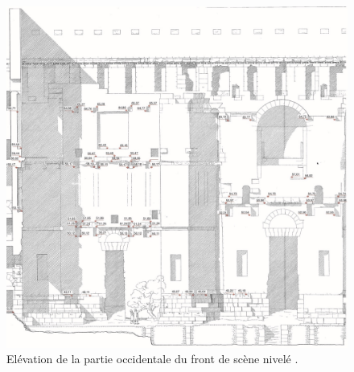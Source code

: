 \begin{figure}[!h]
	\includegraphics[width=\linewidth]{images/frontdescene}
	\caption[Elévation du front de scène.]{Elévation de la partie occidentale du front de scène nivelé \cite[Pl. XXIX]{orangePl}.}
	\label{frontdescene} 
\end{figure} 
	
